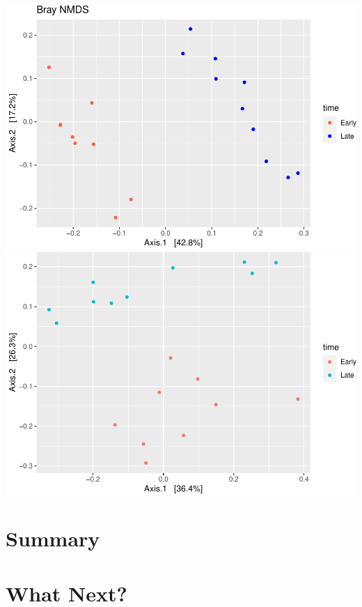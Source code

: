 \documentclass[
]{book}
\begin{document}
\includegraphics{16sworkshop_files/figure-latex/unnamed-chunk-3-1.pdf} \includegraphics{16sworkshop_files/figure-latex/unnamed-chunk-3-2.pdf}

\hypertarget{summary}{%
\chapter{Summary}\label{summary}}

\hypertarget{what-next}{%
\chapter{What Next?}\label{what-next}}

  
\end{document}
